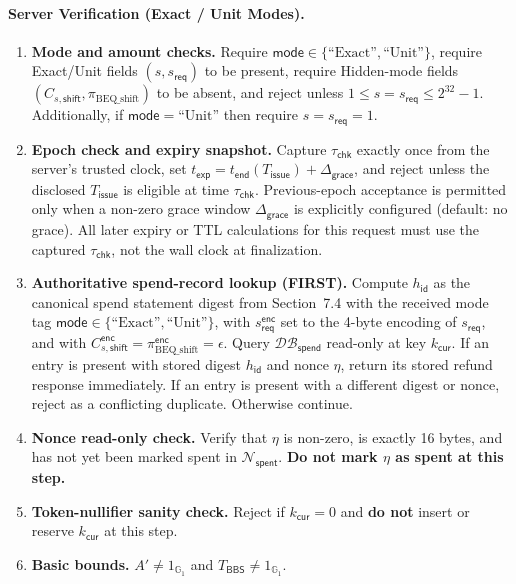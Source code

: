 \documentclass[11pt]{article}
\theoremstyle{definitionstyle}
\theoremstyle{plain}
\newcommand{\DB}{\mathcal{DB}}
\begin{document}
\paragraph{Server Verification (Exact / Unit Modes).}
\begin{enumerate}[leftmargin=*]
\item \textbf{Mode and amount checks.} Require $\mathsf{mode} \in \{\text{``Exact''},\text{``Unit''}\}$, require Exact/Unit fields $(s, s_{\mathsf{req}})$ to be present, require Hidden-mode fields $(C_{s,\mathsf{shift}}, \pi_{\text{BEQ\_shift}})$ to be absent, and reject unless $1 \le s = s_{\mathsf{req}} \le 2^{32}-1$. Additionally, if $\mathsf{mode}=\text{``Unit''}$ then require $s = s_{\mathsf{req}} = 1$.
\item \textbf{Epoch check and expiry snapshot.} Capture $\tau_{\mathsf{chk}}$ exactly once from the server's trusted clock, set $t_{\mathsf{exp}} = t_{\mathsf{end}}(T_{\mathsf{issue}})+\Delta_{\mathsf{grace}}$, and reject unless the disclosed $T_{\mathsf{issue}}$ is eligible at time $\tau_{\mathsf{chk}}$. Previous-epoch acceptance is permitted only when a non-zero grace window $\Delta_{\mathsf{grace}}$ is explicitly configured (default: no grace). All later expiry or TTL calculations for this request must use the captured $\tau_{\mathsf{chk}}$, not the wall clock at finalization.
\item \textbf{Authoritative spend-record lookup (FIRST).} Compute $h_{\mathsf{id}}$ as
  the canonical spend statement digest from Section~7.4 with
  the received mode tag $\mathsf{mode} \in \{\text{``Exact''},\text{``Unit''}\}$, with $s_{\mathsf{req}}^{\mathsf{enc}}$ set
  to the 4-byte encoding of $s_{\mathsf{req}}$, and with
  $C_{s,\mathsf{shift}}^{\mathsf{enc}} = \pi_{\text{BEQ\_shift}}^{\mathsf{enc}} = \epsilon$.
  Query $\DB_{\mathsf{spend}}$ read-only at key $k_{\mathsf{cur}}$. If an entry is present with stored digest $h_{\mathsf{id}}$ and nonce $\eta$, return its stored refund response immediately. If an entry is present with a different digest or nonce, reject as a conflicting duplicate. Otherwise continue.
\item \textbf{Nonce read-only check.} Verify that $\eta$ is non-zero, is exactly 16 bytes, and has not yet been marked spent in $\mathcal{N}_{\mathsf{spent}}$. \textbf{Do not mark $\eta$ as spent at this step.}
\item \textbf{Token-nullifier sanity check.} Reject if $k_{\mathsf{cur}} = 0$ and \textbf{do not} insert or reserve $k_{\mathsf{cur}}$ at this step.
\item \textbf{Basic bounds.} $A' \neq 1_{\mathbb{G}_1}$ and $T_{\mathsf{BBS}} \neq 1_{\mathbb{G}_1}$.

\end{enumerate}
\end{document}
